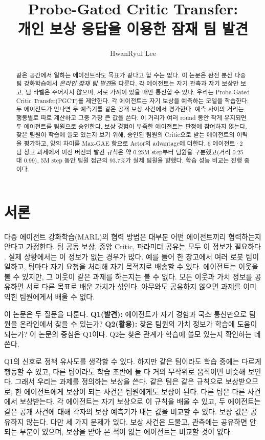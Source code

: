 \documentclass[10pt,twocolumn,letterpaper]{article}
\title{Probe-Gated Critic Transfer:\\개인 보상 응답을 이용한 잠재 팀 발견}
\author{HwanRyul Lee}
\date{}
\begin{document}
\maketitle


\begin{abstract}
같은 공간에서 일하는 에이전트라도 목표가 같다고 할 수는 없다. 이 논문은 완전 분산 다중 팀 강화학습에서 \emph{온라인 잠재 팀 발견}을 다룬다. 각 에이전트는 자기 관측과 자기 보상만 보고, 팀 라벨은 주어지지 않으며, 서로 가까이 있을 때만 통신할 수 있다. 우리는 Probe-Gated Critic Transfer(PGCT)를 제안한다. 각 에이전트는 자기 보상을 예측하는 모델을 학습한다. 두 에이전트가 만나면 두 예측기를 같은 공개 보상 사건에서 평가한다. 예측 사이의 거리는 행동별로 따로 계산하고 그중 가장 큰 값을 쓴다. 이 거리가 여러 round 동안 작게 유지되면 두 에이전트를 팀원으로 승인한다. 보상 경험이 부족한 에이전트는 판정에 참여하지 않는다. 찾은 팀원이 학습에 쓸모 있는지 보기 위해, 승인된 팀원의 Critic으로 받는 에이전트의 이력을 평가하고, 양의 차이를 Max-GAE 항으로 Actor의 advantage에 더한다. 6 에이전트·2 팀 창고 과제에서 이전 버전의 발견 규칙은 약 0.25M step부터 팀원을 구분했고(거리 0.25 대 0.99), 5M step 동안 팀원 접근의 93.7\%가 실제 팀원을 향했다. 학습 성능 비교는 진행 중이다.
\end{abstract}

\section{서론}
다중 에이전트 강화학습(MARL)의 협력 방법은 대부분 어떤 에이전트끼리 협력하는지 안다고 가정한다. 팀 공동 보상, 중앙 Critic, 파라미터 공유는 모두 이 정보가 필요하다 \citep{mappo,seps}. 실제 상황에서는 이 정보가 없는 경우가 많다. 예를 들어 한 창고에서 여러 로봇 팀이 일하고, 팀마다 자기 요청을 처리해 자기 목적지로 배송할 수 있다. 에이전트는 이웃을 볼 수 있지만, 그 이웃이 같은 과제를 하는지는 볼 수 없다. 모든 이웃과 가치 정보를 공유하면 서로 다른 목표로 배운 가치가 섞인다. 아무와도 공유하지 않으면 과제를 이미 익힌 팀원에게서 배울 수 없다.

이 논문은 두 질문을 다룬다. \textbf{Q1(발견):} 에이전트가 자기 경험과 국소 통신만으로 팀원을 온라인에서 찾을 수 있는가? \textbf{Q2(활용):} 찾은 팀원의 가치 정보가 학습에 도움이 되는가? 이 논문의 중심은 Q1이다. Q2는 찾은 관계가 학습에 쓸모 있는지 확인하는 데 쓴다.

Q1의 신호로 정책 유사도를 생각할 수 있다. 하지만 같은 팀이라도 학습 중에는 다르게 행동할 수 있고, 다른 팀이라도 학습 초반에 둘 다 거의 무작위로 움직이면 비슷해 보인다. 그래서 우리는 과제를 정의하는 보상을 쓴다. 같은 팀은 같은 규칙으로 보상받으므로, 한 에이전트에게 보상이 되는 사건은 팀원에게도 보상이 된다. 다른 팀은 다른 사건에서 보상받는다. 각 에이전트는 자기 보상으로 이 규칙을 배울 수 있고, 두 에이전트는 같은 공개 사건에 대해 각자의 보상 예측기가 내는 값을 비교할 수 있다. 보상 값은 공유하지 않는다. 다만 세 가지 문제가 있다. 보상 사건은 드물고, 관측에는 공유하면 안 되는 부분이 있으며, 보상을 받아 본 적이 없는 에이전트는 비교할 것이 없다.
\end{document}
